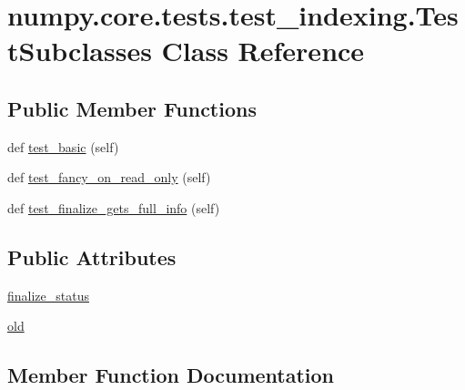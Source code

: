 \hypertarget{classnumpy_1_1core_1_1tests_1_1test__indexing_1_1TestSubclasses}{}\section{numpy.\+core.\+tests.\+test\+\_\+indexing.\+Test\+Subclasses Class Reference}
\label{classnumpy_1_1core_1_1tests_1_1test__indexing_1_1TestSubclasses}
\subsection*{Public Member Functions}
\begin{DoxyCompactItemize}
\item 
def \hyperlink{classnumpy_1_1core_1_1tests_1_1test__indexing_1_1TestSubclasses_af95d136a8e57768cdaeb58d7f112f1f6}{test\+\_\+basic} (self)
\item 
def \hyperlink{classnumpy_1_1core_1_1tests_1_1test__indexing_1_1TestSubclasses_a7aaa9ef28348bd940a56e308c5983841}{test\+\_\+fancy\+\_\+on\+\_\+read\+\_\+only} (self)
\item 
def \hyperlink{classnumpy_1_1core_1_1tests_1_1test__indexing_1_1TestSubclasses_af5516041812023c9e21f41d2948683e5}{test\+\_\+finalize\+\_\+gets\+\_\+full\+\_\+info} (self)
\end{DoxyCompactItemize}
\subsection*{Public Attributes}
\begin{DoxyCompactItemize}
\item 
\hyperlink{classnumpy_1_1core_1_1tests_1_1test__indexing_1_1TestSubclasses_ab46adcc2a42a8e8f60df9cacc44678e5}{finalize\+\_\+status}
\item 
\hyperlink{classnumpy_1_1core_1_1tests_1_1test__indexing_1_1TestSubclasses_a4e176f0c7d9f0d335236b4edcb5a9418}{old}
\end{DoxyCompactItemize}


\subsection{Member Function Documentation}
\mbox{\label{classnumpy_1_1core_1_1tests_1_1test__indexing_1_1TestSubclasses_af95d136a8e57768cdaeb58d7f112f1f6}} 
